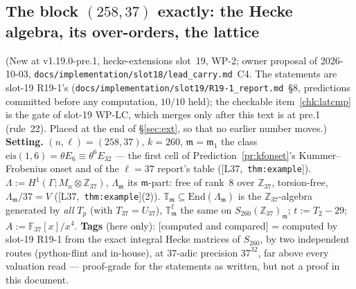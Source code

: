 \documentclass[11pt]{article}
\theoremstyle{remark}
\newcommand{\F}{\mathbb{F}}
\newcommand{\Z}{\mathbb{Z}}
\newcommand{\End}{\mathrm{End}}
\newcommand{\Ga}{\Gamma}
\newcommand{\T}{\mathbb{T}}
\newcommand{\m}{\mathfrak{m}}
\newcommand{\Mn}{M_n}
\newcommand{\CMPD}{\textsf{[computed and compared]}}   %
\newcommand{\Lcite}[1]{[L37,~\texttt{#1}]}             %
\begin{document}
\subsection{The block \texorpdfstring{$(258,37)$}{(258,37)} exactly: the Hecke algebra, its over-orders, the lattice}\label{sec:block258}
(New at v1.19.0-pre.1, hecke-extensions slot~19, WP-2; owner proposal of 2026-10-03, \texttt{docs/implementation/slot18/lead\_carry.md}~C4. The statements
are slot-19 R19-1's (\texttt{docs/implementation/slot19/R19-1\_report.md}~\S8, predictions committed before any computation, $10/10$ held); the checkable
item~\ref{chk:latcmp} is the gate of slot-19 WP-LC, which merges only after this text is at pre.1 (rule~22). Placed at the end of \S\ref{sec:ext}, so that no
earlier number moves.) \textbf{Setting.} $(n,\ell)=(258,37)$, $k=260$, $\m=\m_1$ the class $\mathrm{eis}(1,6)=\theta E_6\equiv\theta^{6}E_{32}$ --- the first cell of
Prediction~\ref{pr:kfonset}'s Kummer--Frobenius onset and of the $\ell=37$ report's table (\Lcite{thm:example}). $\Lambda:=H^{1}(\Ga;\Mn\otimes\Z_{37})$,
$\Lambda_\m$ its $\m$-part: free of rank~$8$ over $\Z_{37}$, torsion-free, $\Lambda_\m/37=V$ (\Lcite{thm:example}(2)). $\T_\m\subseteq\End(\Lambda_\m)$ is the
$\Z_{37}$-algebra generated by \emph{all} $T_p$ (with $T_{37}=U_{37}$), $\T^{\mathrm f}_\m$ the same on $S_{260}(\Z_{37})_\m$; $t:=T_2-29$; $A:=\F_{37}[x]/x^{4}$.
\textbf{Tags} (here only): \CMPD{} = computed by slot-19 R19-1 from the exact integral Hecke matrices of $S_{260}$, by two independent routes (python-flint and
in-house), at $37$-adic precision $37^{32}$, far above every valuation read --- proof-grade for the statements as written, but not a proof in this document.
\end{document}
